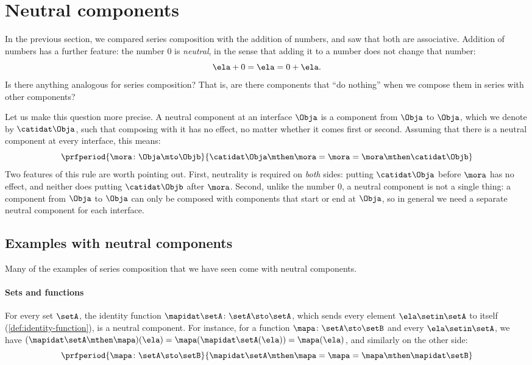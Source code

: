 

\section{Neutral components}
\label{sec:neutral-components}

In the previous section, we compared series composition with the addition of numbers, and saw that both are associative. Addition of numbers has a further feature: the number $0$ is \emph{neutral}, in the sense that adding it to a number does not change that number:
\begin{equation}
    \ela + 0 = \ela = 0 + \ela.
\end{equation}
Is there anything analogous for series composition? That is, are there components that ``do nothing'' when we compose them in series with other components?

Let us make this question more precise. A neutral component at an interface $\Obja$ is a component from $\Obja$ to $\Obja$, which we denote by $\catidat\Obja$, such that composing with it has no effect, no matter whether it comes first or second. Assuming that there is a neutral component at every interface, this means:
\begin{equation}
    \label{eq:neutral-generic}
    \prfperiod{
        \mora \colon \Obja \mto \Objb
    }{
        \catidat\Obja \mthen \mora = \mora = \mora \mthen \catidat\Objb
    }
\end{equation}
Two features of this rule are worth pointing out. First, neutrality is required on \emph{both} sides: putting $\catidat\Obja$ before $\mora$ has no effect, and neither does putting $\catidat\Objb$ after $\mora$. Second, unlike the number $0$, a neutral component is not a single thing: a component from $\Obja$ to $\Obja$ can only be composed with components that start or end at $\Obja$, so in general we need a separate neutral component for each interface.

\subsection{Examples with neutral components}

Many of the examples of series composition that we have seen come with neutral components.

\paragraph{Sets and functions}
For every set $\setA$, the identity function $\mapidat\setA \colon \setA \sto \setA$, which sends every element $\ela \setin \setA$ to itself (\cref{def:identity-function}), is a neutral component. For instance, for a function $\mapa \colon \setA \sto \setB$ and every $\ela \setin \setA$, we have $(\mapidat\setA \mthen \mapa)(\ela) = \mapa(\mapidat\setA(\ela)) = \mapa(\ela)$, and similarly on the other side:
\begin{equation}
    \label{eq:neutral-sets}
    \prfperiod{
        \mapa \colon \setA \sto \setB
    }{
        \mapidat\setA \mthen \mapa = \mapa = \mapa \mthen \mapidat\setB
    }
\end{equation}

